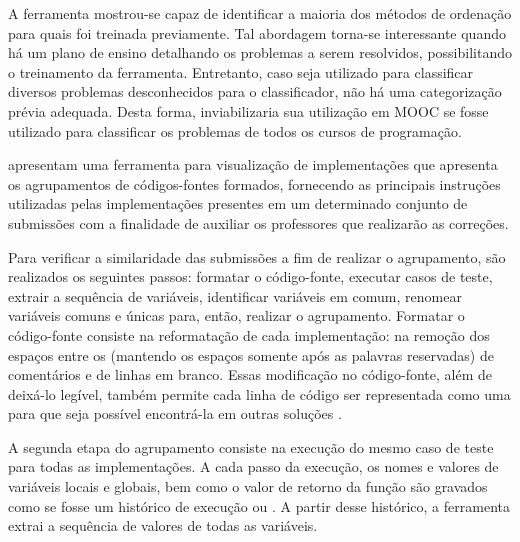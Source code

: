 		A ferramenta mostrou-se capaz de identificar a maioria dos métodos de ordenação
		para quais foi treinada previamente. Tal abordagem torna-se interessante quando
		há um plano de ensino detalhando os problemas a serem resolvidos, possibilitando
		o treinamento da ferramenta. Entretanto, caso seja utilizado para classificar
		diversos problemas desconhecidos para o classificador, não há uma categorização
		prévia adequada. Desta forma, inviabilizaria sua utilização em \acs{MOOC} se fosse
		utilizado para classificar os problemas de todos os cursos de programação.
		
		 apresentam uma ferramenta para visualização de
		implementações que apresenta os agrupamentos de códigos-fontes formados,
		fornecendo as principais instruções utilizadas pelas implementações presentes
		em um determinado conjunto de submissões com a finalidade de auxiliar os
		professores que realizarão as correções.
		
		
		Para verificar a similaridade das submissões a fim de realizar o agrupamento,
		são realizados os seguintes passos: formatar o código-fonte, executar casos
		de teste, extrair a sequência de variáveis, identificar variáveis em comum,
		renomear variáveis comuns e únicas para, então, realizar o agrupamento.
		Formatar o código-fonte consiste na reformatação de cada implementação: na
		remoção dos espaços entre os  (mantendo os espaços somente
		após as palavras reservadas) de comentários e de linhas em branco. Essas
		modificação no código-fonte, além de deixá-lo legível, também permite cada
		linha de código ser representada como uma  para que seja
		possível encontrá-la em outras soluções \cite{Glassman:2015}.
		
		A segunda etapa do agrupamento consiste na execução do mesmo caso de teste
		para todas as implementações. A cada passo da execução, os nomes e valores de
		variáveis locais e globais, bem como o valor de retorno da função são gravados
		como se fosse um histórico de execução ou . A partir desse
		histórico, a ferramenta extrai a sequência de valores de todas as variáveis.
		
